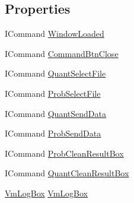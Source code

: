 \subsection*{Properties}
\begin{DoxyCompactItemize}
\item 
I\+Command \hyperlink{class_a_d_net_1_1_g_u_i_1_1_view_model_1_1_vm_client_view_af076c415b9cf78e0259aa6425c2e9048}{Window\+Loaded}
\item 
I\+Command \hyperlink{class_a_d_net_1_1_g_u_i_1_1_view_model_1_1_vm_client_view_a704b249203700cebcc0e586218ee1dec}{Command\+Btn\+Close}
\item 
I\+Command \hyperlink{class_a_d_net_1_1_g_u_i_1_1_view_model_1_1_vm_client_view_ab91372b2d49a003e47a9e3162df7453e}{Quant\+Select\+File}
\item 
I\+Command \hyperlink{class_a_d_net_1_1_g_u_i_1_1_view_model_1_1_vm_client_view_a4918acfff07bd382a8ccbd46a6679820}{Prob\+Select\+File}
\item 
I\+Command \hyperlink{class_a_d_net_1_1_g_u_i_1_1_view_model_1_1_vm_client_view_aae9c3d6a628c9e6f87343a741bb4f0b8}{Quant\+Send\+Data}
\item 
I\+Command \hyperlink{class_a_d_net_1_1_g_u_i_1_1_view_model_1_1_vm_client_view_a26e1469451f207d8ce85fd1f500066aa}{Prob\+Send\+Data}
\item 
I\+Command \hyperlink{class_a_d_net_1_1_g_u_i_1_1_view_model_1_1_vm_client_view_a2629757ee9798f7ec3eacf11fbb3f220}{Prob\+Clean\+Result\+Box}
\item 
I\+Command \hyperlink{class_a_d_net_1_1_g_u_i_1_1_view_model_1_1_vm_client_view_ab993bc8a66e4a566de294bd56612d2a2}{Quant\+Clean\+Result\+Box}
\item 
\hyperlink{class_node_net_1_1_g_u_i_1_1_view_model_1_1_vm_log_box}{Vm\+Log\+Box} \hyperlink{class_a_d_net_1_1_g_u_i_1_1_view_model_1_1_vm_client_view_a035c80f3b7bccc3156c157c055066e1c}{Vm\+Log\+Box}

\end{DoxyCompactItemize}

